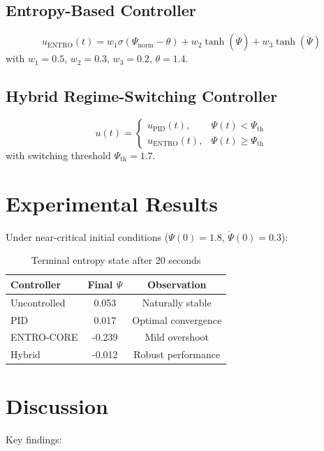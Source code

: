 \documentclass[twocolumn]{article}
\begin{document}
\subsection{Entropy-Based Controller}
\begin{equation}
u_{\text{ENTRO}}(t) = w_1 \sigma(\Psi_{\text{norm}} - \theta) + w_2 \tanh(\dot\Psi) + w_3 \tanh(\ddot\Psi)
\end{equation}
with $w_1=0.5$, $w_2=0.3$, $w_3=0.2$, $\theta=1.4$.

\subsection{Hybrid Regime-Switching Controller}
\begin{equation}
u(t) = \begin{cases}
u_{\text{PID}}(t), & \Psi(t) < \Psi_{\text{th}} \\
u_{\text{ENTRO}}(t), & \Psi(t) \ge \Psi_{\text{th}}
\end{cases}
\end{equation}
with switching threshold $\Psi_{\text{th}} = 1.7$.

\section{Experimental Results}

Under near-critical initial conditions ($\Psi(0)=1.8$, $\dot\Psi(0)=0.3$):

\begin{table}[h]
\centering
\caption{Terminal entropy state after 20 seconds}
\begin{tabular}{lcc}
\toprule
\textbf{Controller} & \textbf{Final $\Psi$} & \textbf{Observation} \\
\midrule
Uncontrolled & 0.053 & Naturally stable \\
PID & 0.017 & Optimal convergence \\
ENTRO-CORE & -0.239 & Mild overshoot \\
Hybrid & -0.012 & Robust performance \\
\bottomrule
\end{tabular}
\label{tab:results}
\end{table}

\section{Discussion}

Key findings:
\end{document}

